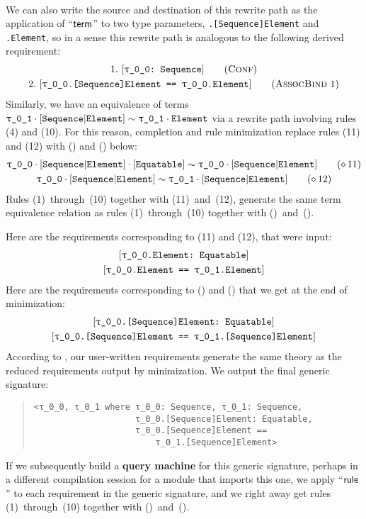 \documentclass[../generics]{subfiles}
\begin{document}
\begin{example}
\begin{gather*}
\end{gather*}
We can also write the source and destination of this rewrite path as the application of ``$\mathsf{term}$'' to two type parameters, \texttt{\rT.[Sequence]Element} and \texttt{\rT.Element}, so in a sense this rewrite path is analogous to the following derived requirement:
\begin{gather*}
\ConfStep{\rT}{Sequence}{1}\\
\AssocBindStep{1}{\rT.[Sequence]Element}{\rT.Element}{2}
\end{gather*}
Similarly, we have an equivalence of terms $\rU\cdot\assocsym{Sequence}{Element} \sim \rU\cdot\nElement$ via a rewrite path involving rules (4) and (10). For this reason, completion and rule minimization replace rules (11) and (12) with () and () below:
\begin{gather*}
\ConfRule{\rT\cdot\assocsym{Sequence}{Element}}{\protosym{Equatable}}\tag{\CRule{11}}\\
\SameRule{\rT\cdot\assocsym{Sequence}{Element}}{\rU\cdot\assocsym{Sequence}{Element}}\tag{\CRule{12}}
\end{gather*}
Rules (1)~through~(10) together with (11)~and~(12), generate the same term equivalence relation as rules (1)~through~(10) together with ()~and~().

Here are the requirements corresponding to (11) and (12), that were input:
\begin{gather*}
\ConfReq{\rT.Element}{Equatable}\\
\SameReq{\rT.Element}{\rU.Element}
\end{gather*}
Here are the requirements corresponding to () and () that we get at the end of minimization:
\begin{gather*}
\ConfReq{\rT.[Sequence]Element}{Equatable}\\
\SameReq{\rT.[Sequence]Element}{\rU.[Sequence]Element}
\end{gather*}
According to , our user-written requirements generate the same theory as the reduced requirements output by minimization. We output the final generic signature:
\begin{quote}
\begin{verbatim}
<τ_0_0, τ_0_1 where τ_0_0: Sequence, τ_0_1: Sequence,
                    τ_0_0.[Sequence]Element: Equatable,
                    τ_0_0.[Sequence]Element ==
                        τ_0_1.[Sequence]Element>
\end{verbatim}
\end{quote}
If we subsequently build a \textbf{query machine} for this generic signature, perhaps in a different compilation session for a module that imports this one, we apply ``$\mathsf{rule}$'' to each requirement in the generic signature, and we right away get rules (1)~through~(10) together with ()~and~().
\end{example}
\end{document}
